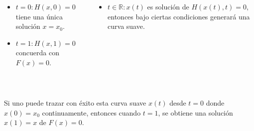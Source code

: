 \begin{frame}
	\begin{columns}
		\begin{column}{0.48\textwidth}
			\begin{itemize}
				\item

				      \begin{math}
					      t=0:
					      H\left(x,0\right)=
					      0
				      \end{math}
				      tiene una única solución $x=x_{0}$.

				\item

				      \begin{math}
					      t=1:
					      H\left(x,1\right)=
					      0
				      \end{math}
				      concuerda con
				      $F\left(x\right)=0$.
			\end{itemize}
		\end{column}
		\begin{column}{0.48\textwidth}
			\begin{itemize}
				\item

				      $t\in\mathbb{R}: x\left(t\right)$ es solución de
				      $H\left(x\left(t\right),t\right)=0$, entonces bajo
				      ciertas condiciones generará una curva suave.
			\end{itemize}
		\end{column}
	\end{columns}

	\

	Si uno puede trazar con éxito esta curva suave $x\left(t\right)$
	desde $t=0$ donde $x\left(0\right)=x_{0}$ continuamente, entonces
	cuando $t=1$, se obtiene una solución $x\left(1\right)=x$
	de $F\left(x\right)=0$.
\end{frame}

